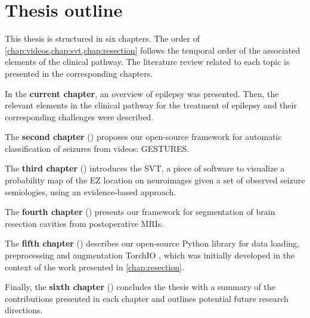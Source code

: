 \section{Thesis outline}

This thesis is structured in six chapters.
The order of \cref{chap:videos,chap:svt,chap:resection} follows the temporal order of the associated elements of the clinical pathway.
The literature review related to each topic is presented in the corresponding chapters.

In the \textbf{current chapter}, an overview of epilepsy was presented.
Then, the relevant elements in the clinical pathway for the treatment of epilepsy and their corresponding challenges were described.

The \textbf{second chapter} () proposes our open-source framework for automatic classification of seizures from videos: \ac{GESTURES}.

The \textbf{third chapter} () introduces the \ac{SVT}, a piece of software to visualize a probability map of the \ac{EZ} location on neuroimages given a set of observed seizure semiologies, using an evidence-based approach.

The \textbf{fourth chapter} () presents our framework for segmentation of brain resection cavities from postoperative \acp{MRI}.

The \textbf{fifth chapter} () describes our open-source Python library for data loading, preprocessing and augmentation TorchIO \cite{perez-garcia_torchio_2021}, which was initially developed in the context of the work presented in \cref{chap:resection}.

Finally, the \textbf{sixth chapter} () concludes the thesis with a summary of the contributions presented in each chapter and outlines potential future research directions.
